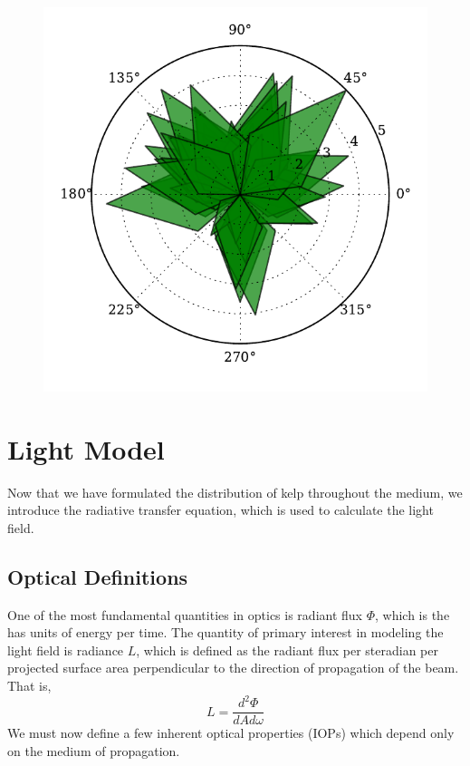 \begin{figure}[h]
	\centering
	\includegraphics[width=.75\linewidth]{kelp_sample}
	\vspace{-2em}
	\label{fig:kelp_sample}
\end{figure}


\section{Light Model}

Now that we have formulated the distribution of kelp throughout the medium, we introduce the radiative transfer equation, which is used to calculate the light field.

\subsection{Optical Definitions}
One of the most fundamental quantities in optics is radiant flux $\Phi$, which is the has units of energy per time.
The quantity of primary interest in modeling the light field is radiance $L$, which is defined as the radiant flux per steradian per projected surface area perpendicular to the direction of propagation of the beam.
That is,
\begin{equation}
	L = \frac{d^2\Phi}{dA d\omega}
\end{equation}
We must now define a few inherent optical properties (IOPs) which depend only on the medium of propagation.

